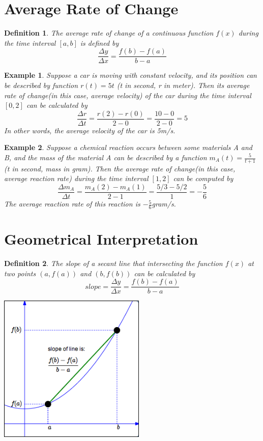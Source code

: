 \documentclass{article}
\newtheorem{definition}{Definition}
\newtheorem{ex}{Example}
\begin{document}
\section{Average Rate of Change}
\begin{definition}
	The average rate of change of a continuous function $f(x)$ during the time interval $[a,b]$ is defined by 
	\[ \frac{\Delta y}{\Delta x} = \frac{f(b)-f(a)}{b-a} \]
\end{definition}

\begin{ex}
	Suppose a car is moving with constant velocity, and its position can be described by function $r(t) = 5t$ (t in second, r in meter). Then its average rate of change(in this case, average velocity) of the car during the time interval $[0,2]$ can be calculated by
	\[ \frac{\Delta r}{\Delta t} = \frac{r(2)-r(0)}{2-0} = \frac{10-0}{2-0}=5 \]
	In other words, the average velocity of the car is 5m/s. 
\end{ex}

\begin{ex}
	Suppose a chemical reaction occurs between some materials A and B, and the mass of the material A can be described by a function $m_A(t) = \frac{5}{t+1}$ (t in second, mass in gram). Then the average rate of change(in this case, average reaction rate) during the time interval $[1,2]$ can be computed by 
	 \[ \frac{\Delta m_A}{\Delta t} = \frac{m_A(2)-m_A(1)}{2-1} = \frac{5/3 - 5/2}{1} = -\frac{5}{6} \]
	 The average reaction rate of this reaction is $-\frac{5}{6}$gram/s.
\end{ex}


\section{Geometrical Interpretation}
\begin{definition}
	The slope of a secant line that intersecting the function $f(x)$ at two points $(a,f(a))$ and $(b,f(b))$ can be calculated by
	\[ slope = \frac{\Delta y}{\Delta x} = \frac{f(b)-f(a)}{b-a} \]
	
	\begin{center}
		\includegraphics*[width=7cm]{avroc.png}
	\end{center}
\end{definition}
\end{document}
